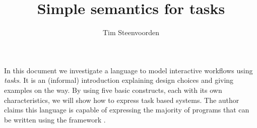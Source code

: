 \documentclass
  [a4paper
  ,justified
  ,nofonts
  ]{tufte-handout}
\begin{document}
\title{Simple semantics for tasks}
\author{Tim Steenvoorden}

\maketitle

In this document we investigate a language to model interactive workflows using \emph{tasks}.
It is an (informal) introduction explaining design choices and giving examples on the way.
By using five basic constructs,
each with its own characteristics,
we will show how to express task based systems.
The author claims this language is capable of expressing the majority of programs that can be written using the \ITASKS framework \cite{conf/pepm/PlasmeijerAKLNG11}.

\tableofcontents
\newpage












\end{document}
